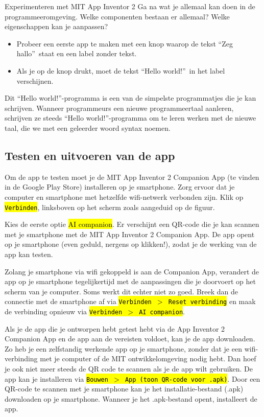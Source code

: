 \begin{opdracht}{Experimenteren met MIT App Inventor 2}
Ga na wat je allemaal kan doen in de programmeeromgeving. Welke componenten bestaan er allemaal? Welke eigenschappen kan je aanpassen?

\begin{itemize}
	\item Probeer een eerste app te maken met een knop waarop de tekst \textquotedblleft Zeg hallo\textquotedblright \ staat en een label zonder tekst. 
	\item Als je op de knop drukt, moet de tekst \textquotedblleft Hello world!\textquotedblright \ in het label verschijnen. 
\end{itemize}

Dit \textquotedblleft Hello world!\textquotedblright-programma is een van de simpelste programmatjes die je kan schrijven. Wanneer programmeurs een nieuwe programmeertaal aanleren, schrijven ze steeds \textquotedblleft Hello world!\textquotedblright-programma om te leren werken met de nieuwe taal, die we met een geleerder woord syntax noemen.
\end{opdracht}

\subsection{Testen en uitvoeren van de app}
Om de app te testen moet je de MIT App Inventor 2 Companion App (te vinden in de Google Play Store) installeren op je smartphone. 
Zorg ervoor dat je computer en smartphone met hetzelfde wifi-netwerk verbonden zijn. 
Klik op \hl{\texttt{Verbinden}}, linksboven op het scherm zoals aangeduid op de figuur.


Kies de eerste optie \hl{AI companion}. Er verschijnt een QR-code die je kan scannen met je smartphone met de MIT App Inventor 2 Companion App. De app opent op je smartphone (even geduld, nergens op klikken!), zodat je de werking van de app kan testen.

Zolang je smartphone  via wifi gekoppeld is aan de Companion App, verandert de app op je smartphone tegelijkertijd met de aanpassingen die je doorvoert op het scherm van je computer. Soms werkt dit echter niet zo goed. Breek dan de connectie met de smartphone af via \hl{\texttt{Verbinden $>$ Reset verbinding}} en maak de verbinding opnieuw via \hl{\texttt{Verbinden $>$ AI companion}}.

Als je de app die je ontworpen hebt getest hebt via de App Inventor 2 Companion App en de app aan de vereisten voldoet, kan je de app downloaden. Zo heb je een zelfstandig werkende app op je smartphone, zonder dat je een wifi-verbinding met je computer of de MIT ontwikkelomgeving nodig hebt. Dan hoef je ook niet meer steeds de QR code te scannen als je de app wilt gebruiken. De app kan je installeren via \hl{\texttt{Bouwen $>$ App (toon QR-code voor .apk)}}. Door een QR-code te scannen met je smartphone kan je het installatie-bestand (.apk) downloaden op je smartphone. Wanneer je het .apk-bestand opent, installeert de app.

